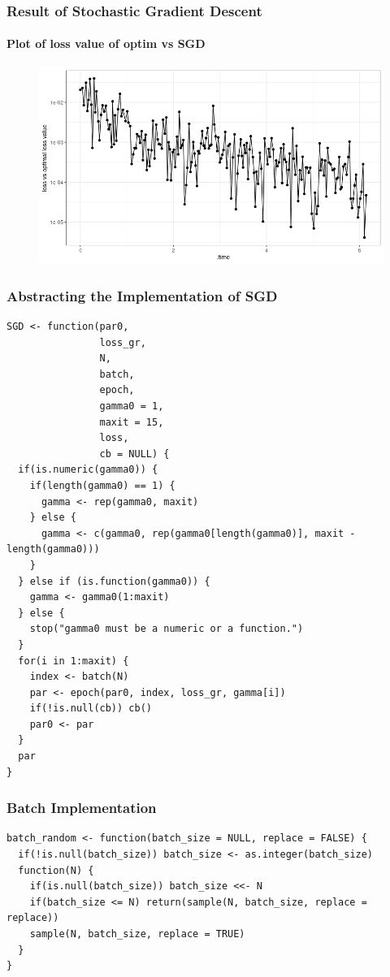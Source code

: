 \documentclass[aspectratio=169]{beamer}
\begin{document}
\begin{frame}
    \frametitle{Result of Stochastic Gradient Descent}
    \framesubtitle{Plot of loss value of optim vs SGD}
    \begin{figure}
        \centering
        \includegraphics[scale = 0.4]{figure/SGD1_loss.png}
    \end{figure}
\end{frame}
\begin{frame}[fragile]
    \frametitle{Abstracting the Implementation of SGD}
\begin{verbatim}
SGD <- function(par0,
                loss_gr,
                N,
                batch,
                epoch,
                gamma0 = 1,
                maxit = 15,
                loss,
                cb = NULL) {
  if(is.numeric(gamma0)) {
    if(length(gamma0) == 1) {
      gamma <- rep(gamma0, maxit)
    } else {
      gamma <- c(gamma0, rep(gamma0[length(gamma0)], maxit - length(gamma0)))
    }
  } else if (is.function(gamma0)) {
    gamma <- gamma0(1:maxit)
  } else {
    stop("gamma0 must be a numeric or a function.")
  }
  for(i in 1:maxit) {
    index <- batch(N)
    par <- epoch(par0, index, loss_gr, gamma[i])
    if(!is.null(cb)) cb()
    par0 <- par
  }
  par
}
\end{verbatim}
\end{frame}
\begin{frame}[fragile]
    \frametitle{Batch Implementation}
\begin{verbatim}
batch_random <- function(batch_size = NULL, replace = FALSE) {
  if(!is.null(batch_size)) batch_size <- as.integer(batch_size)
  function(N) {
    if(is.null(batch_size)) batch_size <<- N
    if(batch_size <= N) return(sample(N, batch_size, replace = replace))
    sample(N, batch_size, replace = TRUE)
  }
}
\end{verbatim}
\end{frame}
\end{document}
